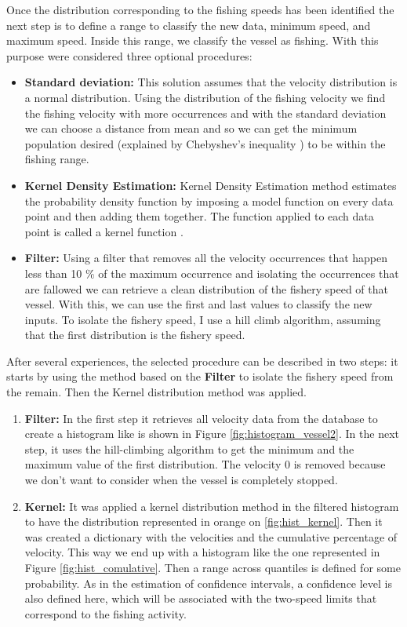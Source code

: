 Once the distribution corresponding to the fishing speeds has been identified the next step is to define a range to classify the new data, minimum speed, and maximum speed.
Inside this range, we classify the vessel as fishing. With this purpose were considered three optional procedures:
\begin{itemize}
\item    \textbf{Standard deviation:}
This solution assumes that the velocity distribution is a normal distribution.   Using the distribution of the fishing velocity we find the fishing velocity with more occurrences and with the standard deviation we can choose a distance from mean and so we can get the minimum population desired (explained by Chebyshev’s inequality \cite{Chebyshevinequality}) to be within the fishing range. 

\item    \textbf{Kernel Density Estimation:}
Kernel Density Estimation method estimates the probability density function by imposing a model function on every data point and then adding them together. The function applied to each data point is called a kernel function \cite{KernelDensityEstimation}.

\item    \textbf{Filter:}
Using a filter that removes all the velocity occurrences that happen less than 10 \% of the maximum occurrence and isolating the occurrences that are fallowed we can retrieve a clean distribution of the fishery speed of that vessel.  With this, we can use the first and last values to classify the new inputs. To isolate the fishery speed, I use a hill climb algorithm, assuming that the first distribution is the fishery speed.
\end{itemize}

After several experiences, the selected procedure can be described in two steps:  it starts by using the method based on the \textbf{Filter} to isolate the fishery speed from the remain. Then the Kernel distribution method was applied.
\begin{enumerate}


\item    \textbf{Filter:} In the first step it retrieves all velocity data from the database to create a histogram like is shown in Figure \ref{fig:histogram_vessel2}. In the next step, it uses the hill-climbing algorithm to get the minimum and the maximum value of the first distribution. The velocity 0 is removed because we don’t want to consider when the vessel is completely stopped. 
\item    \textbf{Kernel:} It was applied a kernel distribution method in the filtered histogram to have the distribution represented in orange on \ref{fig:hist_kernel}. Then it was created a dictionary with the velocities and the cumulative percentage of velocity. This way we end up with a histogram like the one represented in Figure \ref{fig:hist_comulative}.  
Then a range across quantiles is defined for some probability. As in the estimation of confidence intervals, a confidence level is also defined here, which will be associated with the two-speed limits that correspond to the fishing activity.
\end{enumerate}  

